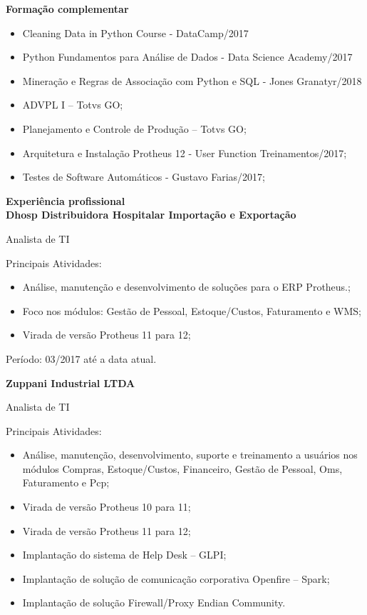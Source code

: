 \documentclass[a4paper,10pt]{report}
\begin{document}
\vspace{1em}
\textbf{\large{Formação complementar}}

\begin{itemize}
\addtolength{\baselineskip}{-1\baselineskip}

 \item Cleaning Data in Python Course - DataCamp/2017
 \item Python Fundamentos para Análise de Dados - Data Science Academy/2017
 \item Mineração e Regras de Associação com Python e SQL - Jones Granatyr/2018
 \item ADVPL I – Totvs GO;
 \item Planejamento e Controle de Produção – Totvs GO;
 \item Arquitetura e Instalação Protheus 12 - User Function Treinamentos/2017;
 \item Testes de Software Automáticos - Gustavo Farias/2017;
\end{itemize}

\vspace{1em}
\textbf{\large{Experiência profissional}}
\\


\textbf{Dhosp Distribuidora Hospitalar Importação e Exportação}

Analista de TI

Principais Atividades:
\begin{itemize}
\item Análise, manutenção e desenvolvimento de soluções para o ERP Protheus.;
\item Foco nos módulos: Gestão de Pessoal, Estoque/Custos, Faturamento e WMS;
\item Virada de versão Protheus 11 para 12;
\end{itemize}

Período: 03/2017 até a  data atual.
\newline

\textbf{Zuppani Industrial LTDA}

Analista de TI

Principais Atividades:
\begin{itemize}
\item Análise, manutenção, desenvolvimento, suporte e treinamento a usuários nos módulos Compras,
Estoque/Custos, Financeiro, Gestão de Pessoal, Oms, Faturamento e Pcp;

\item Virada de versão Protheus 10 para 11;
\item Virada de versão Protheus 11 para 12;

\item Implantação do sistema de Help Desk – GLPI;

\item Implantação de solução de comunicação corporativa Openfire – Spark;

\item Implantação de solução Firewall/Proxy Endian Community.
\end{itemize}
\end{document}
